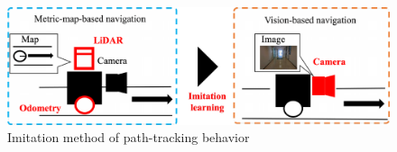 
\vspace{3zh}
\begin{figure}[htbp]
     \centering
      \includegraphics[width=130mm]{images/pdf/imi_abs.pdf}
      \caption{Imitation method of path-tracking behavior}\label{fig:imi_abs}
 \end{figure}


